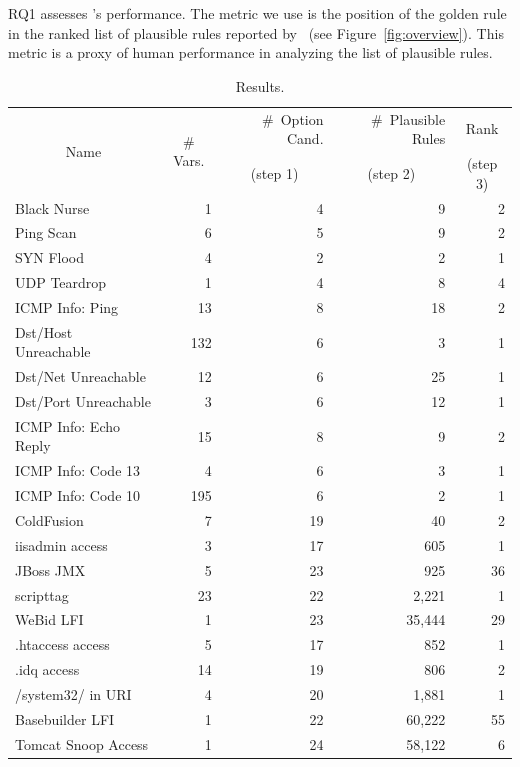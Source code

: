 \documentclass[conference]{IEEEtran}
\begin{document}
RQ1 assesses \tname's performance. The metric we use is the position
of the golden rule in the ranked list of plausible rules reported by
\tname\ (see Figure~\ref{fig:overview}). This metric is a proxy of
human performance in analyzing the list of plausible rules.

\begin{table}[t!]
  \footnotesize
  \setlength{\tabcolsep}{2pt}
  \renewcommand{\arraystretch}{0.5}
  \caption{\label{table:results}Results.}
  \vspace{-2ex}
  \centering
  \begin{tabular}{lrrrr}
    \toprule
    \multicolumn{1}{c}{\multirow{2}{*}{Name}} &
    \multicolumn{1}{c}{\multirow{2}{*}{\# Vars.}} &
    \#~Option Cand. &
    \#~Plausible Rules &    
    \multicolumn{1}{c}{Rank} \\

     &
    \multicolumn{1}{c}{} &
    \multicolumn{1}{c}{(step 1)} &
    \multicolumn{1}{c}{(step 2)} &    
    \multicolumn{1}{c}{(step 3)} \\

    \midrule
    Black Nurse & 1 & 4 & 9 & 2 \\    
    Ping Scan & 6 & 5 & 9 & 2 \\
    SYN Flood & 4 & 2 & 2 & 1 \\
    UDP Teardrop & 1 & 4 & 8 & 4 \\
    ICMP Info: Ping & 13 & 8 & 18 & 2 \\
    Dst/Host Unreachable & 132 & 6 & 3 & 1 \\
    Dst/Net Unreachable & 12 & 6 & 25 & 1 \\
    Dst/Port Unreachable & 3 & 6 & 12 & 1 \\
    ICMP Info: Echo Reply & 15 & 8 & 9 & 2 \\
    ICMP Info: Code 13 & 4 & 6 & 3 & 1 \\
    ICMP Info: Code 10 & 195 & 6 & 2 & 1 \\
    \midrule
    ColdFusion & 7 & 19 & 40 & 2\\
    iisadmin access & 3 & 17 & 605 & 1 \\        
    JBoss JMX & 5 & 23 & 925 & 36 \\
    scripttag & 23 & 22 & 2,221 & 1 \\
    WeBid LFI & 1 & 23 & 35,444 & 29\\    
    .htaccess access & 5 & 17 & 852 & 1\\
    .idq access & 14 & 19 & 806 & 2 \\
    /system32/ in URI & 4 & 20 & 1,881 & 1 \\
    Basebuilder LFI & 1 & 22 & 60,222 & 55 \\
    Tomcat Snoop Access & 1 & 24 & 58,122 & 6 \\
    \bottomrule
  \end{tabular}
\end{table}
\end{document}
